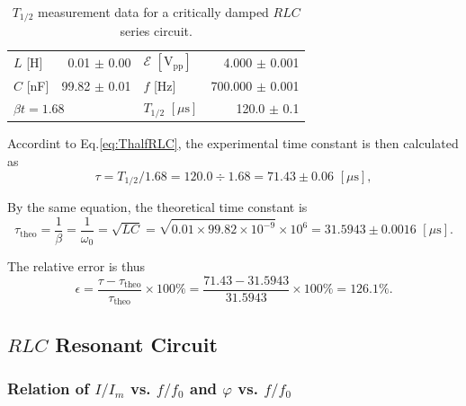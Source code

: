 \documentclass{article}
\begin{document}
\begin{table}[H]\centering
    \begin{tabular}{lr|lr}
        \toprule
        $L$ [H]                               & 0.01 $\pm$ 0.00            & $\mathcal{E}\,\,[\text{V}_{\text{pp}}]$ & 4.000 $\pm$ 0.001   \\
        $C$ [nF]                              & 99.82 $\pm$ 0.01           & $f$ [Hz]                                & 700.000 $\pm$ 0.001 \\
        \multicolumn{2}{l|}{$\beta t = 1.68$} & $T_{1/2}\,\,[\mu\text{s}]$ & 120.0 $\pm$ 0.1                                               \\
        \bottomrule
    \end{tabular}
    \caption{$T_{1/2}$ measurement data for a critically damped $RLC$ series circuit.}\label{TableRLC}
\end{table}

Accordint to Eq.\eqref{eq:ThalfRLC}, the experimental time constant is then calculated as
$$\tau = T_{1/2}/1.68 = 120.0 \div 1.68 = 71.43 \pm 0.06\,\,[\mu\text{s}],$$

By the same equation, the theoretical time constant is
$$\tau_{\text{theo}} = \frac{1}{\beta} = \frac{1}{\omega_0} = \sqrt{LC} = \sqrt{0.01 \times 99.82 \times 10^{-9}} \times 10^{6} = 31.5943 \pm 0.0016 \,\,[\mu\text{s}].$$

The relative error is thus
$$\epsilon = \frac{\tau - \tau_{\text{theo}}}{\tau_{\text{theo}}} \times 100\% = \frac{71.43 - 31.5943}{31.5943} \times 100\% = 126.1\%.$$

\subsection{$RLC$ Resonant Circuit}

\subsubsection{Relation of $I/I_m$ vs. $f/f_0$ and $\varphi$ vs. $f/f_0$}
\end{document}
